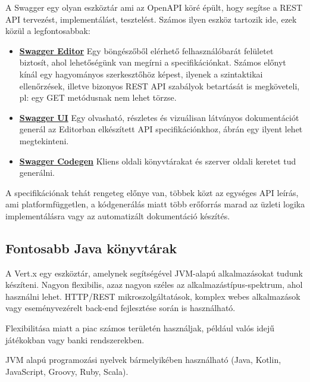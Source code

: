 A Swagger \cite{swagger.io} egy olyan eszköztár ami az OpenAPI köré épült, hogy segítse a REST API tervezést, implementálást, tesztelést. Számos ilyen eszköz tartozik ide, ezek közül a legfontosabbak:
\begin{itemize}
	\item \textbf{\href{https://editor.swagger.io/?_ga=2.32011518.1535494714.1606415394-1420243541.1606415394}{Swagger Editor}} Egy böngészőből elérhető felhasználóbarát felületet biztosít, ahol lehetőségünk van megírni a specifikációnkat. Számos előnyt kínál egy hagyományos szerkesztőhöz képest, ilyenek a szintaktikai ellenőrzések, illetve bizonyos REST API szabályok betartását is megköveteli, pl: egy GET metódusnak nem lehet törzse.
	\item  \textbf{\href{https://swagger.io/swagger-ui/}{Swagger UI}} Egy olvasható, részletes és vizuálisan látványos dokumentációt generál az Editorban elkészített API specifikációnkhoz,  ábrán egy ilyent lehet megtekinteni.
	\item  \textbf{\href{https://github.com/swagger-api/swagger-codegen}{Swagger Codegen}} Kliens oldali könyvtárakat és szerver oldali keretet tud generálni.
\end{itemize}

A specifikációnak tehát rengeteg előnye van, többek közt az egységes API leírás, ami platformfüggetlen, a kódgenerálás miatt több erőforrás marad az üzleti logika implementálásra vagy  az automatizált dokumentáció készítés.
\subsection{Fontosabb Java könyvtárak}
A Vert.x \cite{vertx} egy eszköztár, amelynek segítségével JVM-alapú alkalmazásokat tudunk készíteni. Nagyon flexibilis, azaz nagyon széles az alkalmazástípus-spektrum, ahol használni lehet. HTTP/REST mikroszolgáltatások, komplex webes alkalmazások vagy eseményvezérelt back-end fejlesztése során is használható.

Flexibilitása miatt a piac számos területén használjak, például valós idejű játékokban vagy banki rendszerekben.

JVM alapú programozási nyelvek bármelyikében használható (Java, Kotlin, JavaScript, Groovy, Ruby, Scala).

